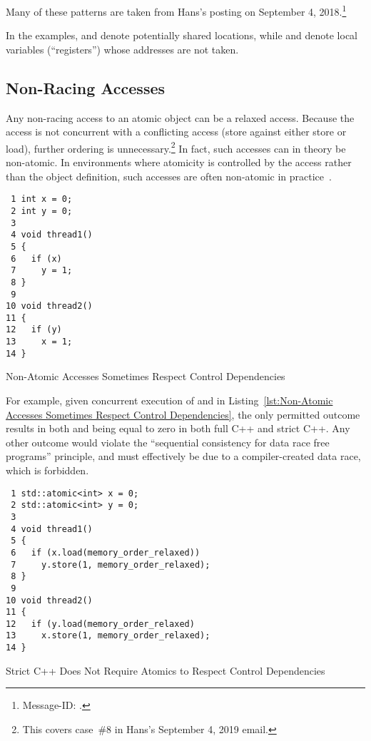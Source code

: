 \documentclass[10]{article}
\begin{document}
Many of these patterns are taken from Hans's 
posting on September 4, 2018.\footnote{
	Message-ID: .}

In the examples,  and  denote potentially shared locations,
while  and  denote local variables (``registers'') whose
addresses are not taken.

\subsection{Non-Racing Accesses}
\label{sec:Non-Racing Accesses}

Any non-racing access to an atomic object can be a relaxed access.
Because the access is not concurrent with a conflicting access (store
against either store or load), further ordering is unnecessary.\footnote{
	This covers case~\#8 in Hans's September 4, 2019 email.}
In fact, such accesses can in theory be non-atomic.
In environments where atomicity is controlled by the access rather
than the object definition, such accesses are often non-atomic in
practice~\cite{JadeAlglave2019WhoAfraidCompiler}.

\begin{listing}[tbp]
\begin{verbatim}
 1 int x = 0;
 2 int y = 0;
 3
 4 void thread1()
 5 {
 6   if (x)
 7     y = 1;
 8 }
 9
10 void thread2()
11 {
12   if (y)
13     x = 1;
14 }
\end{verbatim}
\caption{Non-Atomic Accesses Sometimes Respect Control Dependencies}
\label{lst:Non-Atomic Accesses Sometimes Respect Control Dependencies}
\end{listing}

For example, given concurrent execution of  and
 in
Listing~\ref{lst:Non-Atomic Accesses Sometimes Respect Control Dependencies},
the only permitted outcome results in both  and  being
equal to zero in both full C++ and strict C++.
Any other outcome would violate the ``sequential consistency for
data race free programs'' principle, and must effectively be due to a
compiler-created data race, which is forbidden.

\begin{listing}[tbp]
\begin{verbatim}
 1 std::atomic<int> x = 0;
 2 std::atomic<int> y = 0;
 3
 4 void thread1()
 5 {
 6   if (x.load(memory_order_relaxed))
 7     y.store(1, memory_order_relaxed);
 8 }
 9
10 void thread2()
11 {
12   if (y.load(memory_order_relaxed)
13     x.store(1, memory_order_relaxed);
14 }
\end{verbatim}
\caption{Strict C++ Does Not Require Atomics to Respect Control Dependencies}
\label{lst:Strict C++ Does Not Require Atomics to Respect Control Dependencies}
\end{listing}
\end{document}

